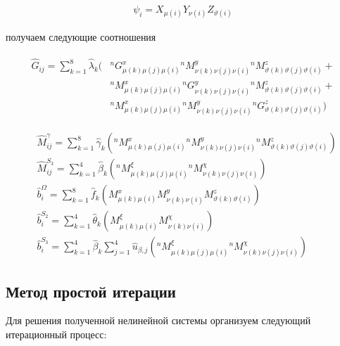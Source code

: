 \documentclass[12pt]{article}
\begin{document}
\begin{align}
  \psi_i = X_{\mu(i)}Y_{\nu(i)}Z_{\vartheta(i)}
\end{align}

\vskip 2mm
\noindent получаем следующие соотношения

\begin{align}
  \begin{split}
    \hat{G}_{ij} = \sum_{k=1}^{8}\hat{\lambda}_{k}(
      &{}^{n}G^{x}_{\mu(k)\mu(j)\mu(i)}{}^{n}M^{y}_{\nu(k)\nu(j)\nu(i)}{}^{n}M^{z}_{\vartheta(k)\vartheta(j)\vartheta(i)}+\\
      &{}^{n}M^{x}_{\mu(k)\mu(j)\mu(i)}{}^{n}G^{y}_{\nu(k)\nu(j)\nu(i)}{}^{n}M^{z}_{\vartheta(k)\vartheta(j)\vartheta(i)}+\\
      &{}^{n}M^{x}_{\mu(k)\mu(j)\mu(i)}{}^{n}M^{y}_{\nu(k)\nu(j)\nu(i)}{}^{n}G^{z}_{\vartheta(k)\vartheta(j)\vartheta(i)}
    )
  \end{split}
\end{align}

\begin{align}
  &\hat{M}^{\gamma}_{ij} = \sum_{k=1}^{8}\hat{\gamma}_{k}(
      {}^{n}M^{x}_{\mu(k)\mu(j)\mu(i)}{}^{n}M^{y}_{\nu(k)\nu(j)\nu(i)}{}^{n}M^{z}_{\vartheta(k)\vartheta(j)\vartheta(i)}
  ) \\
  &\hat{M}^{S_3}_{ij} = \sum_{k=1}^{4}\hat{\beta}_{k}(
      {}^{n}M^{\xi}_{\mu(k)\mu(j)\mu(i)}{}^{n}M^{\chi}_{\nu(k)\nu(j)\nu(i)}
  ) \\
  &\hat{b}^{\Omega}_{i} = \sum_{k=1}^{8}\hat{f}_{k}(
      M^{x}_{\mu(k)\mu(i)}M^{y}_{\nu(k)\nu(i)}M^{z}_{\vartheta(k)\vartheta(i)}
  ) \\
  &\hat{b}^{S_2}_{i} = \sum_{k=1}^{4}\hat{\theta}_{k}(
      M^{\xi}_{\mu(k)\mu(i)}M^{\chi}_{\nu(k)\nu(i)}
  ) \\
  &\hat{b}^{S_3}_{i} = \sum_{k=1}^{4}\hat{\beta}_{k}\sum_{j=1}^{4}\hat{u}_{\beta, j}(
      {}^{n}M^{\xi}_{\mu(k)\mu(j)\mu(i)}{}^{n}M^{\chi}_{\nu(k)\nu(j)\nu(i)}
  )
\end{align}

\subsection{Метод простой итерации}

\noindent
Для решения полученной нелинейной системы организуем следующий итерационный процесс:

\begin{align}
\end{align}
\end{document}
